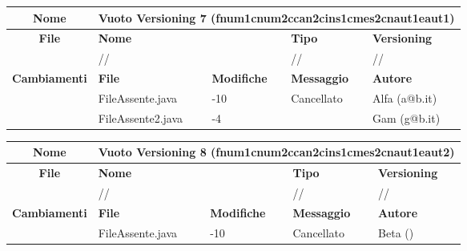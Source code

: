 \begin{table}[ht]
\footnotesize
\begin{tabular}{|c|p{2.5cm}|p{2cm}|p{2.5cm}|p{2.5cm}|}
  \hline
  \textbf{Nome}	& \multicolumn{4}{l|}{Vuoto Versioning 7 (fnum1cnum2ccan2cins1cmes2cnaut1eaut1)} 							\\
  \hline
  \rowcolor{lightgray}\textbf{File} 		& \multicolumn{2}{l|}{\textbf{Nome}}		& \textbf{Tipo}		& \textbf{Versioning} 		\\
						\cline{2-5}
						& \multicolumn{2}{l|}{//}			& //			& //				\\
  \hline
  \rowcolor{lightgray}\textbf{Cambiamenti}	& \textbf{File}		&\textbf{Modifiche}	& \textbf{Messaggio}	& \textbf{Autore}		\\
						\cline{2-5}
						& FileAssente.java	& -10	  		& Cancellato		& Alfa (a@b.it)			\\
						\cline{2-5}
						& FileAssente2.java	& -4	  		& 			& Gam (g@b.it)			\\
  \hline
\end{tabular}
\end{table}

\begin{table}[ht]
\footnotesize
\begin{tabular}{|c|p{2.5cm}|p{2cm}|p{2.5cm}|p{2.5cm}|}
  \hline
  \textbf{Nome}	& \multicolumn{4}{l|}{Vuoto Versioning 8 (fnum1cnum2ccan2cins1cmes2cnaut1eaut2)} 							\\
  \hline
  \rowcolor{lightgray}\textbf{File} 		& \multicolumn{2}{l|}{\textbf{Nome}}		& \textbf{Tipo}		& \textbf{Versioning} 		\\
						\cline{2-5}
						& \multicolumn{2}{l|}{//}			& //			& //				\\
  \hline
  \rowcolor{lightgray}\textbf{Cambiamenti}	& \textbf{File}		&\textbf{Modifiche}	& \textbf{Messaggio}	& \textbf{Autore}		\\
						\cline{2-5}
						& FileAssente.java	& -10	  		& Cancellato		& Beta ()			\\
						
  \hline
\end{tabular}
\end{table}






